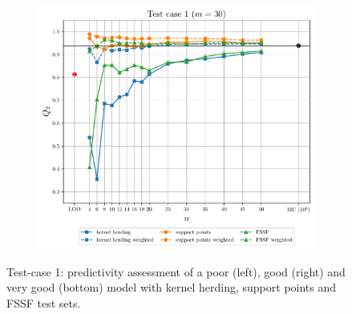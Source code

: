 \begin{figure}
\begin{subfigure}[b]{0.49\linewidth}
  \end{subfigure}
  \\
  \centering
  \begin{subfigure}[b]{0.49\linewidth}
    \centering
    \includegraphics[width=\linewidth]{./part2/figures/SIS/irregular_learnsize_30.pdf}
  \end{subfigure}
  \caption{Test-case 1: predictivity assessment of a poor (left), good (right) and very good (bottom) model with kernel herding, support points and FSSF test sets.}
  \label{fig:irregular_benchmark}
\end{figure}



